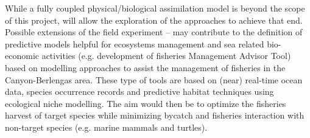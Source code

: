 While a fully coupled physical/biological assimilation model is beyond
the scope of this project, \proj will allow the exploration of the
approaches to achieve that end.  Possible extensions of the field
experiment – may contribute to the definition of predictive models
helpful for ecosystems management and sea related bio-economic
activities (e.g. development of fisheries Management Advisor Tool)
based on modelling approaches to assist the management of fisheries in
the \naz Canyon-Berlengas area. These type of tools are based on
(near) real-time ocean data, species occurrence records and predictive
habitat techniques using ecological niche modelling. The aim would
then be to optimize the fisheries harvest of target species while
minimizing bycatch and fisheries interaction with non-target species
(e.g. marine mammals and turtles).


